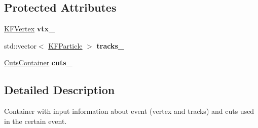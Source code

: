\subsection*{Protected Attributes}
\begin{DoxyCompactItemize}
\item 
\hyperlink{classKFVertex}{K\+F\+Vertex} {\bfseries vtx\+\_\+}\hypertarget{classInputContainer_a66b98870925df549191771baa3f7a789}{}\label{classInputContainer_a66b98870925df549191771baa3f7a789}

\item 
std\+::vector$<$ \hyperlink{classKFParticle}{K\+F\+Particle} $>$ {\bfseries tracks\+\_\+}\hypertarget{classInputContainer_a87ee73c56e8c5bf1d77483864881e473}{}\label{classInputContainer_a87ee73c56e8c5bf1d77483864881e473}

\item 
\hyperlink{classCutsContainer}{Cuts\+Container} {\bfseries cuts\+\_\+}\hypertarget{classInputContainer_af65fc096dd7c157dac46a3ed88432a64}{}\label{classInputContainer_af65fc096dd7c157dac46a3ed88432a64}

\end{DoxyCompactItemize}


\subsection{Detailed Description}
Container with input information about event (vertex and tracks) and cuts used in the certain event. 

